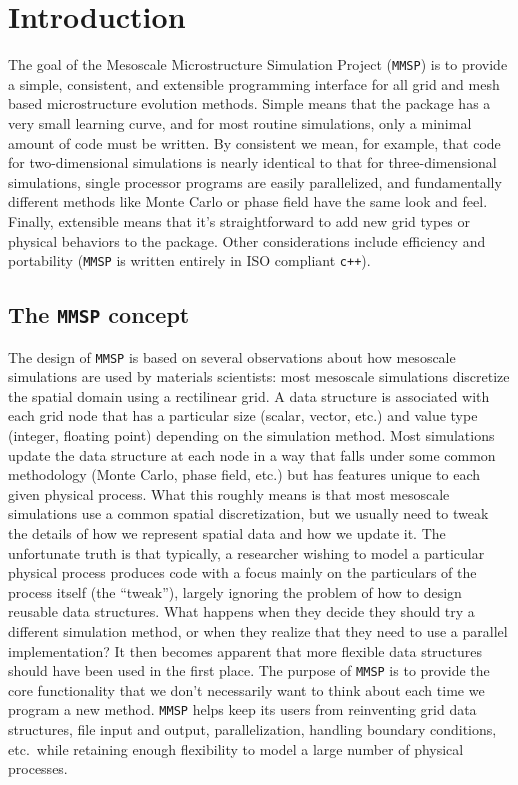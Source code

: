 
\chapter{Introduction}
The goal of the Mesoscale Microstructure Simulation Project ({\tt MMSP}) is to provide a simple, consistent, and extensible programming interface for all grid and mesh based microstructure evolution methods. Simple means that the package has a very small learning curve, and for most routine simulations, only a minimal amount of code must be written. By consistent we mean, for example, that code for two-dimensional simulations is nearly identical to that for three-dimensional simulations, single processor programs are easily parallelized, and fundamentally different methods like Monte Carlo or phase field have the same look and feel. Finally, extensible means that it's straightforward to add new grid types or physical behaviors to the package. Other considerations include efficiency and portability ({\tt MMSP} is written entirely in ISO compliant {\tt c++}).

\section{The {\tt MMSP} concept}
The design of {\tt MMSP} is based on several observations about how mesoscale simulations are used by materials scientists: most mesoscale simulations discretize the spatial domain using a rectilinear grid. A data structure is associated with each grid node that has a particular size (scalar, vector, etc.) and value type (integer, floating point) depending on the simulation method. Most simulations update the data structure at each node in a way that falls under some common methodology (Monte Carlo, phase field, etc.) but has features unique to each given physical process.  What this roughly means is that most mesoscale simulations use a common spatial discretization, but we usually need to tweak the details of how we represent spatial data and how we update it. The unfortunate truth is that typically, a researcher wishing to model a particular physical process produces code with a focus mainly on the particulars of the process itself (the ``tweak''), largely ignoring the problem of how to design reusable data structures. What happens when they decide they should try a different simulation method, or when they realize that they need to use a parallel implementation?  It then becomes apparent that more flexible data structures should have been used in the first place.  The purpose of {\tt MMSP} is to provide the core functionality that we don't necessarily want to think about each time we program a new method.  {\tt MMSP} helps keep its users from reinventing grid data structures, file input and output, parallelization, handling boundary conditions, etc.\ while retaining enough flexibility to model a large number of physical processes.

